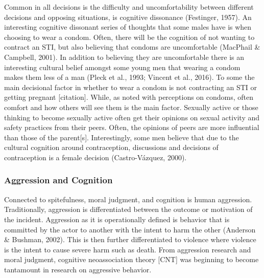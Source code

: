 \documentclass[
  english,
  donotrepeattitle,doc, 12pt, a4paper,floatsintext]{apa7}
\begin{document}
Common in all decisions is the difficulty and uncomfortability between different decisions and opposing situations, is cognitive dissonance (Festinger, 1957). An interesting cognitive dissonant series of thoughts that some males have is when choosing to wear a condom. Often, there will be the cognition of not wanting to contract an STI, but also believing that condoms are uncomfortable (MacPhail \& Campbell, 2001). In addition to believing they are uncomfortable there is an interesting cultural belief amongst some young men that wearing a condom makes them less of a man (Pleck et al., 1993; Vincent et al., 2016). To some the main decisional factor in whether to wear a condom is not contracting an STI or getting pregnant {[}citation{]}. While, as noted with perceptions on condoms, often comfort and how others will see them is the main factor. Sexually active or those thinking to become sexually active often get their opinions on sexual activity and safety practices from their peers. Often, the opinions of peers are more influential than those of the parent{[}s{]}. Interestingly, some men believe that due to the cultural cognition around contraception, discussions and decisions of contraception is a female decision (Castro-Vázquez, 2000).

\hypertarget{aggression-and-cognition}{%
\subsubsection{Aggression and Cognition}\label{aggression-and-cognition}}

Connected to spitefulness, moral judgment, and cognition is human aggression. Traditionally, aggression is differentiated between the outcome or motivation of the incident. Aggression as it is operationally defined is behavior that is committed by the actor to another with the intent to harm the other (Anderson \& Bushman, 2002). This is then further differentiated to violence where violence is the intent to cause severe harm such as death. From aggression research and moral judgment, cognitive neoassociation theory {[}CNT{]} was beginning to become tantamount in research on aggressive behavior.
\end{document}
